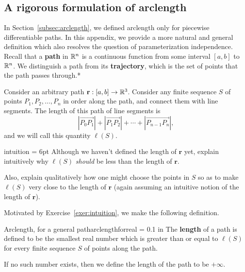 \documentclass{watsonbook}
\begin{document}

\newpage 

\subsection{A rigorous formulation of arclength}
\label{sec:arclengthappendix}

In Section~\ref{subsec:arclength}, we defined arclength only for
piecewise differentiable paths. In this appendix, we provide a more
natural and general definition which also resolves the question of
parameterization independence. Recall that a \textbf{path} in $\mathbb{R}^n$
is a continuous function from some interval $[a,b]$ to $\mathbb{R}^n$. We
distinguish a path from its \textbf{trajectory}, which is the set of
points that the path passes through.* 

Consider an arbitrary path $\mathbf{r}:[a,b] \to \mathbb{R}^3$. Consider any
finite sequence $S$ of points $P_1, P_2, \ldots, P_n$ in order along
the path, and connect them with line segments. The length of this path
of line segments is
\[
  |\overrightarrow{P_0P_1}| +
  |\overrightarrow{P_1P_2}| + \cdots +
  |\overrightarrow{P_{n-1}P_n}|, 
\]
and we will call this quantity $\ell(S)$.

\begin{exercise}{}{intuition} \parskip = 6pt 
  Although we haven't defined the length of $\mathbf{r}$ yet, explain
  intuitively why $\ell(S)$ \textit{should} be less than the length of
  $\mathbf{r}$.

  Also, explain qualitatively how one might choose the points in $S$
  so as to make $\ell(S)$ very close to the length of $\mathbf{r}$
  (again assuming an intuitive notion of the length of $\mathbf{r}$).
\end{exercise}

Motivated by Exercise~\ref{exer:intuition}, we make the following
definition.  

\begin{defn}{Arclength, for a general path}{arclengthforreal}
  \parskip = 0.1 in 
  The \textbf{length} of a path is defined to be the smallest real
  number which is greater than or equal to $\ell(S)$ for every
  finite sequence $S$ of points along the path.

  If no such number exists, then we define the length of the path to be
  $+\infty$. 
\end{defn}
\end{document}
